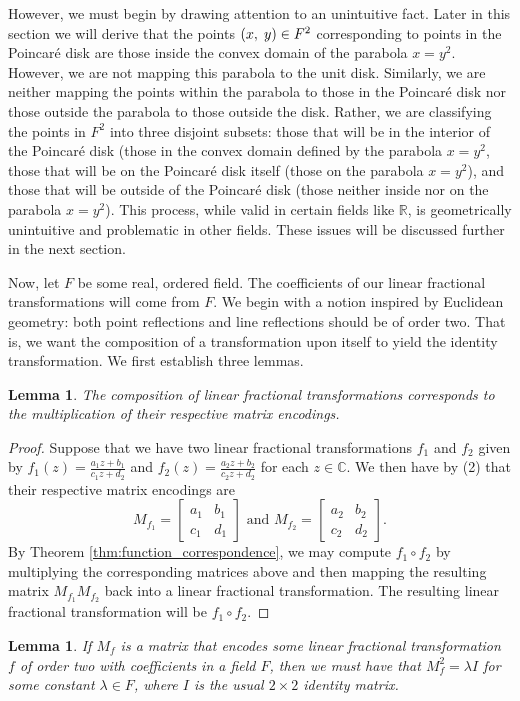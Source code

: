 \documentclass[12pt]{article}
\newcommand{\R}{\mathbb{R}}
\newcommand{\C}{\mathbb{C}}
\newcommand{\lftmat}[4]{\begin{bmatrix} {#1} & {#2} \\ {#3} & {#4} \end{bmatrix}}
\newcommand{\ttc}{, \hspace{1mm}}
\newcommand{\poincare}{Poincar\'{e} }
\theoremstyle{plain}
\newtheorem{lemma}[theorem]{Lemma}
\theoremstyle{definition}
\begin{document}
However, we must begin by drawing attention to an unintuitive fact. Later in this section we will derive that the points $(x\ttc y) \in F^2$ corresponding to points in the \poincare disk are those inside the convex domain of the parabola $x = y^2$. However, we are not mapping this parabola to the unit disk. Similarly, we are neither mapping the points within the parabola to those in the \poincare disk nor those outside the parabola to those outside the disk. Rather, we are classifying the points in $F^2$ into three disjoint subsets: those that will be in the interior of the \poincare disk (those in the convex domain defined by the parabola $x = y^2$, those that will be on the \poincare disk itself (those on the parabola $x = y^2$), and those that will be outside of the \poincare disk (those neither inside nor on the parabola $x = y^2$). This process, while valid in certain fields like $\R$, is geometrically unintuitive and problematic in other fields. These issues will be discussed further in the next section. 

Now, let $F$ be some real, ordered field. The coefficients of our linear fractional transformations will come from $F$. We begin with a notion inspired by Euclidean geometry: both point reflections and line reflections should be of order two. That is, we want the composition of a transformation upon itself to yield the identity transformation. We first establish three lemmas. 

\begin{lemma} 
	The composition of linear fractional transformations corresponds to the multiplication of their respective matrix encodings.
\end{lemma}

\begin{proof} 
	Suppose that we have two linear fractional transformations $f_1$ and $f_2$ given by $f_1(z) = \frac{a_1z+b_1}{c_1z+d_2}$ and $f_2(z) = \frac{a_2z+b_2}{c_2z+d_2}$ for each $z \in \C$. We then have by (2) that their respective matrix encodings are 
\[ 
	M_{f_1} = \lftmat{a_1}{b_1}{c_1}{d_1} 
	\text{ and } 
	M_{f_2} =  \lftmat{a_2}{b_2}{c_2}{d_2}. 
\] 
	By Theorem \ref{thm:function_correspondence}, we may compute $f_1\circ f_2$ by multiplying the corresponding matrices above and then mapping the resulting matrix $M_{f_1}M_{f_2}$ back into a linear fractional transformation. The resulting linear fractional transformation will be $f_1\circ f_2$.
\end{proof}	
	
\begin{lemma}
	If $M_f$ is a matrix that encodes some linear fractional transformation $f$ of order two with coefficients in a field $F$, then we must have that $M_f^2 = \lambda I$ for some constant $\lambda \in F$, where $I$ is the usual $2 \times 2$ identity matrix. 
\end{lemma}
\end{document}
